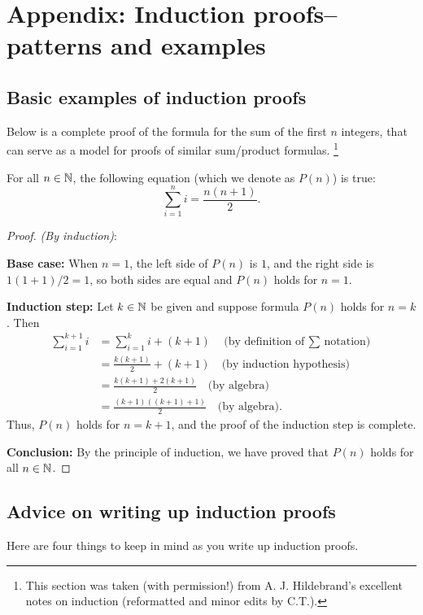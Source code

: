 \chapter{Appendix: Induction proofs--patterns and examples}\label{induction}


\section{ Basic examples of induction proofs}\label{sec:basic_induction}

Below is a complete proof of the
formula for the sum of the first $n$ integers, that can serve as a model
for proofs of similar sum/product formulas. \footnote{This section was taken (with permission!) from A. J. Hildebrand's excellent notes on induction (reformatted and minor edits  by C.T.).}

\begin{prop}\label{proposition:induction:Induction1} For all $n\in\mathbb{N}$, the following equation (which we denote as $P(n)$)  is true:
\[
\sum_{i=1}^n i=\frac{n(n+1)}{2}.
\tag{$P(n)$}
\]
\end{prop}
\begin{proof} \emph{(By induction)}:

\noindent
\textbf{Base case:} When $n=1$, the left side of $P(n)$ is $1$, and the
right side is $1(1+1)/2=1$, so both sides are equal and $P(n)$ holds  
for $n=1$.

\noindent
\textbf{Induction step:} Let $k\in\mathbb{N}$ be given and suppose 
formula $P(n)$ holds for $n=k$. Then
\begin{align*}
\sum_{i=1}^{k+1}i&=\sum_{i=1}^k i + (k+1)\quad\text{(by 
definition of $\sum$ notation)}
\\
&=\frac{k(k+1)}{2}+(k+1)\quad \text{(by induction hypothesis)}
\\
&=\frac{k(k+1)+2(k+1)}{2}\quad \text{(by algebra)}
\\
&=\frac{(k+1)((k+1)+1)}{2}\quad \text{(by algebra)}.
\end{align*}
Thus, $P(n)$ holds for $n=k+1$, and the proof of the induction step is complete. 

\noindent
\textbf{Conclusion:} By the principle of induction, 
we have proved that $P(n)$ holds for all $n\in\mathbb{N}$.  
\end{proof}


\section{Advice on writing up induction proofs}
Here are four things to keep in mind as you write up induction proofs.

